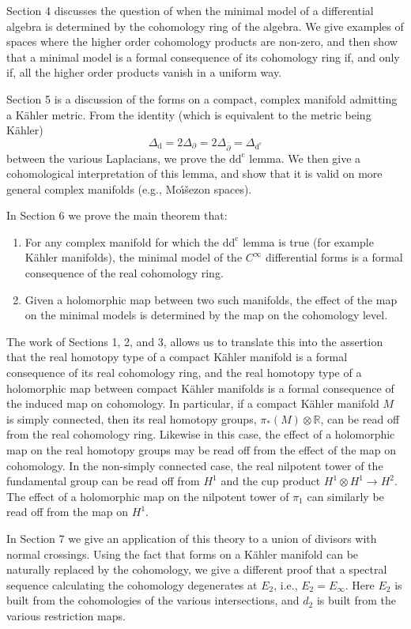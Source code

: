 \documentclass[11pt]{amsart}
\theoremstyle{plain}
\theoremstyle{definition}
\newcommand{\dd}{\mathrm{d}}
\newcommand{\dc}{\mathrm{d}^{\mathrm{c}}}
\newcommand{\del}{\partial}
\newcommand{\delbar}{\bar{\partial}}
\newcommand{\RR}{\mathbb{R}}
\begin{document}
Section 4 discusses the question of when the minimal model of a differential algebra is determined by the cohomology ring of the algebra. We give examples of spaces where the higher order cohomology products are non-zero, and then show that a minimal model is a formal consequence of its cohomology ring if, and only if, all the higher order products vanish in a uniform way.

Section 5 is a discussion of the forms on a compact, complex manifold admitting a K\"ahler metric. From the identity (which is equivalent to the metric being K\"ahler)
\[
\Delta_{\dd} = 2\Delta_{\del} = 2\Delta_{\delbar} = \Delta_{\dc}
\]
between the various Laplacians, we prove the $\dd\dc$ lemma. We then give a cohomological interpretation of this lemma, and show that it is valid on more general complex manifolds (e.g., Mo\'{\i}\v{s}ezon spaces).

In Section 6 we prove the main theorem that:
\begin{enumerate}
\item[1)] For any complex manifold for which the $\dd\dc$ lemma is true (for example K\"ahler manifolds), the minimal model of the $C^{\infty}$ differential forms is a formal consequence of the real cohomology ring.
\item[2)] Given a holomorphic map between two such manifolds, the effect of the map on the minimal models is determined by the map on the cohomology level.
\end{enumerate}

The work of Sections 1, 2, and 3, allows us to translate this into the assertion that the real homotopy type of a compact K\"ahler manifold is a formal consequence of its real cohomology ring, and the real homotopy type of a holomorphic map between compact K\"ahler manifolds is a formal consequence of the induced map on cohomology. In particular, if a compact K\"ahler manifold $M$ is simply connected, then its real homotopy groups, $\pi_{*}(M) \otimes \RR$, can be read off from the real cohomology ring. Likewise in this case, the effect of a holomorphic map on the real homotopy groups may be read off from the effect of the map on cohomology. In the non-simply connected case, the real nilpotent tower of the fundamental group can be read off from $H^{1}$ and the cup product $H^{1} \otimes H^{1} \to H^{2}$. The effect of a holomorphic map on the nilpotent tower of $\pi_{1}$ can similarly be read off from the map on $H^{1}$.

In Section 7 we give an application of this theory to a union of divisors with normal crossings. Using the fact that forms on a K\"ahler manifold can be naturally replaced by the cohomology, we give a different proof that a spectral sequence calculating the cohomology degenerates at $E_{2}$, i.e., $E_{2} = E_{\infty}$. Here $E_{2}$ is built from the cohomologies of the various intersections, and $d_{2}$ is built from the various restriction maps.
\end{document}
